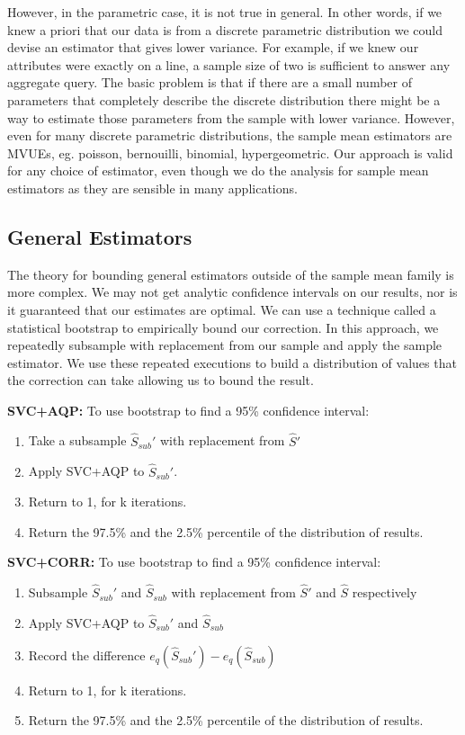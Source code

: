 However, in the parametric case, it is not true in general.
In other words, if we knew a priori that our data is from a discrete parametric distribution we could devise
an estimator that gives lower variance.
For example, if we knew our attributes were exactly on a line, a sample size of two is sufficient to answer any aggregate query.
The basic problem is that if there are a small number of parameters that completely describe the discrete distribution there might be 
a way to estimate those parameters from the sample with lower variance.
However, even for many discrete parametric distributions, the sample mean estimators are MVUEs, eg. poisson, bernouilli, binomial, hypergeometric.
Our approach is valid for any choice of estimator, even though we do the analysis for sample mean estimators as they are sensible in many applications.

\subsection{General Estimators}

The theory for bounding general estimators outside of the sample mean family is more complex.
We may not get analytic confidence intervals on our results, nor is it guaranteed that our estimates are optimal.
We can use a technique called a statistical bootstrap \cite{AgarwalMPMMS13} to empirically bound our correction.
In this approach, we repeatedly subsample with replacement from our sample and apply the sample estimator.
We use these repeated executions to build a distribution of values that the correction can take allowing us to bound the result.

\noindent\textbf{SVC+AQP: } To use bootstrap to find a 95\% confidence interval:
\begin{enumerate}[noitemsep]
\item Take a subsample $\widehat{S}_{sub}'$ with replacement from $\widehat{S}'$
\item Apply SVC+AQP to $\widehat{S}_{sub}'$.
\item Return to 1, for k iterations.
\item Return the 97.5\% and the 2.5\% percentile of the distribution of results.
\end{enumerate}

\noindent\textbf{SVC+CORR: } To use bootstrap to find a 95\% confidence interval:
\begin{enumerate}[noitemsep]
\item Subsample $\widehat{S}_{sub}'$ and $\widehat{S}_{sub}$ with replacement from $\widehat{S}'$ and $\widehat{S}$ respectively
\item Apply SVC+AQP to $\widehat{S}_{sub}'$ and $\widehat{S}_{sub}$
\item Record the difference $e_q(\widehat{S}_{sub}')-e_q(\widehat{S}_{sub})$ 
\item Return to 1, for k iterations.
\item Return the 97.5\% and the 2.5\% percentile of the distribution of results.
\end{enumerate}

